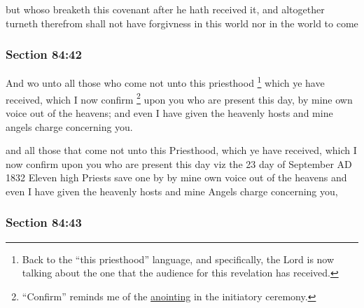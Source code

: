 		\begin{framed}
		\scriptsize
			\begin{compactdesc}
				\item[JSP] but whoso breaketh this covenant after he hath received it, and altogether turneth therefrom shall not have forgivness in this world nor in the world to come
			\end{compactdesc}
		\end{framed}

	\subsubsection{Section 84:42} %
		\label{DC84-42}

		And wo unto all those who come not unto this priesthood%
			\footnote{%
				Back to the ``this priesthood'' language, and specifically, the Lord is now talking about the one that the audience for this revelation has received.
				}
		which ye have received, which I now confirm%
			\footnote{%
				``Confirm'' reminds me of the \hyperref[TEMPLE-ENDOWMENT-INIT-PRE-2005-ANOINT]{anointing} in the initiatory ceremony.
				}
		upon you who are present this day, by mine own voice out of the heavens; and even I have given the heavenly hosts and mine angels charge concerning you.

		\begin{framed}
		\scriptsize
			\begin{compactdesc}
				\item[JSP] and all those that come not unto this Priesthood, which ye have received, which I now confirm upon you who are present this day viz the 23 day of September AD 1832 Eleven high Priests save one by by mine own voice out of the heavens and even I have given the heavenly hosts and mine Angels charge concerning you,
			\end{compactdesc}
		\end{framed}

	\subsubsection{Section 84:43} %
		\label{DC84-43}

